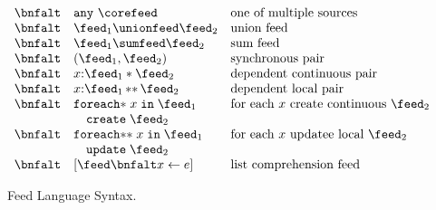 \begin{figure}[t]
\[\begin{array}{lll}
 \bnfalt &     \mathtt{any}\ \corefeed & \mbox{one of multiple sources}\\ 
 \bnfalt & \feed_1 \unionfeed \feed_2 & \mbox{union feed} \\
 \bnfalt & \feed_1 \sumfeed \feed_2 & \mbox{sum feed} \\
 \bnfalt & (\feed_1, \feed_2) & \mbox{synchronous pair} \\
 \bnfalt & x{:}\feed_1 * \feed_2 & \mbox{dependent continuous pair} \\
 \bnfalt & x{:}\feed_1\, {*}{*} \, \feed_2 & \mbox{dependent local pair} \\
 \bnfalt &     \mathtt{foreach{*}}\; x \; 
    \mathtt{in}\; \feed_1 & \mbox{for each $x$ create continuous $\feed_2$} \\
 &   \quad \mathtt{create}\; \feed_2 \\
 \bnfalt &     \mathtt{foreach{*}{*}}\; x \; 
    \mathtt{in}\; \feed_1 & \mbox{for each $x$ updatee local $\feed_2$}\\
 &   \quad \mathtt{update}\; \feed_2 \\
 \bnfalt & [\feed \bnfalt x \leftarrow e ] & \mbox{list comprehension feed} \\
\end{array}
\]
\caption{Feed Language Syntax.}
\label{fig:syntax}
\end{figure}


